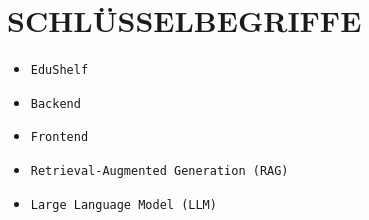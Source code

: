 \chapter{SCHLÜSSELBEGRIFFE}
\thispagestyle{nurSeitenzahl}
\begin{itemize}
    \item \texttt{EduShelf}
    \item \texttt{Backend}
    \item \texttt{Frontend} 
    \item \texttt{Retrieval-Augmented Generation (RAG)}
    \item \texttt{Large Language Model (LLM)}
\end{itemize}

